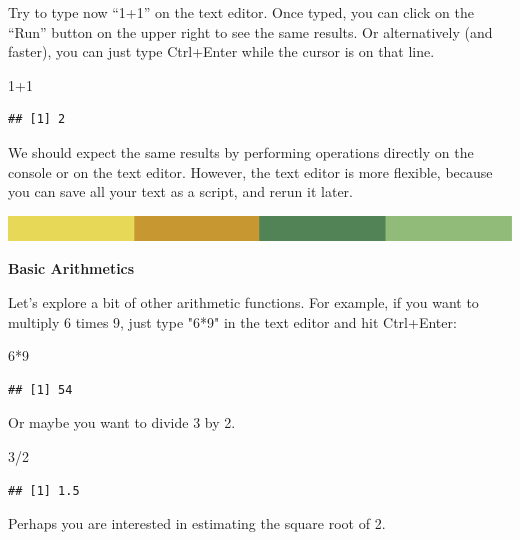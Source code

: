 \documentclass[
]{book}
\newenvironment{Shaded}{\begin{snugshade}}{\end{snugshade}}
\newcommand{\DecValTok}[1]{\textcolor[rgb]{0.00,0.00,0.81}{#1}}
\newcommand{\SpecialCharTok}[1]{\textcolor[rgb]{0.00,0.00,0.00}{#1}}
\begin{document}
Try to type now ``1+1'' on the text editor. Once typed, you can click on the ``Run'' button on the upper right to see the same results. Or alternatively (and faster), you can just type Ctrl+Enter while the cursor is on that line.

\begin{Shaded}
\begin{Highlighting}[]
\DecValTok{1}\SpecialCharTok{+}\DecValTok{1}
\end{Highlighting}
\end{Shaded}

\begin{verbatim}
## [1] 2
\end{verbatim}

We should expect the same results by performing operations directly on the console or on the text editor. However, the text editor is more flexible, because you can save all your text as a script, and rerun it later.

\includegraphics{rsrstrip.png}

\textbf{Basic Arithmetics }

Let's explore a bit of other arithmetic functions. For example, if you want to multiply 6 times 9, just type "6*9" in the text editor and hit Ctrl+Enter:

\begin{Shaded}
\begin{Highlighting}[]
\DecValTok{6}\SpecialCharTok{*}\DecValTok{9}
\end{Highlighting}
\end{Shaded}

\begin{verbatim}
## [1] 54
\end{verbatim}

Or maybe you want to divide 3 by 2.

\begin{Shaded}
\begin{Highlighting}[]
\DecValTok{3}\SpecialCharTok{/}\DecValTok{2}
\end{Highlighting}
\end{Shaded}

\begin{verbatim}
## [1] 1.5
\end{verbatim}

Perhaps you are interested in estimating the square root of 2.
\end{document}
